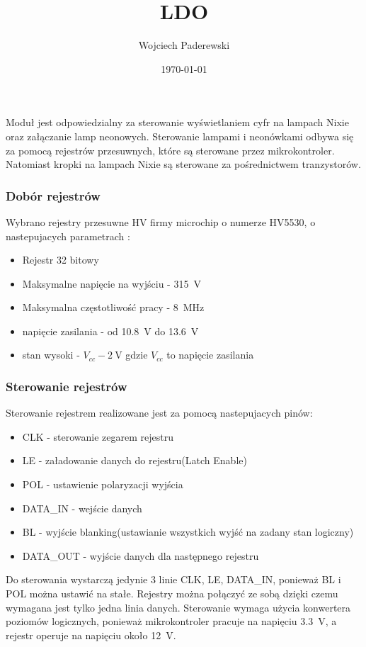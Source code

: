 \documentclass[../../main.tex]{subfiles}
\author{Wojciech Paderewski}
\date{\today}
\title{LDO}
\begin{document}
Moduł jest odpowiedzialny za sterowanie wyświetlaniem cyfr na lampach Nixie oraz załączanie lamp neonowych.
Sterowanie lampami i neonówkami odbywa się za pomocą rejestrów przesuwnych, które są sterowane przez mikrokontroler.
Natomiast kropki na lampach Nixie są sterowane za pośrednictwem tranzystorów.

\subsubsection{Dobór rejestrów}
Wybrano rejestry przesuwne HV firmy microchip o numerze HV5530, o nastepujacych parametrach \cite{st:rejestry}:
\begin{itemize}
    \item Rejestr 32 bitowy
    \item Maksymalne napięcie na wyjściu - \SI{315}{\volt}
    \item Maksymalna częstotliwość pracy - \SI{8}{\mega\hertz}
    \item napięcie zasilania - od \SI{10.8}{\volt} do \SI{13.6}{\volt}
    \item stan wysoki - $V_{cc} - \SI{2}{\volt}$ gdzie $V_{cc}$ to napięcie zasilania
\end{itemize}

\subsubsection{Sterowanie rejestrów}
Sterowanie rejestrem realizowane jest za pomocą nastepujacych pinów:
\begin{itemize}
    \item CLK - sterowanie zegarem rejestru
    \item LE - załadowanie danych do rejestru(Latch Enable)
    \item POL - ustawienie polaryzacji wyjścia
    \item DATA\_IN - wejście danych
    \item BL - wyjście blanking(ustawianie wszystkich wyjść na zadany stan logiczny)
    \item DATA\_OUT - wyjście danych dla następnego rejestru
\end{itemize}

Do sterowania wystarczą jedynie 3 linie CLK, LE, DATA\_IN, ponieważ BL i POL można ustawić na stałe.
Rejestry można połączyć ze sobą dzięki czemu wymagana jest tylko jedna linia danych.
Sterowanie wymaga użycia konwertera poziomów logicznych, ponieważ mikrokontroler pracuje na napięciu \SI{3.3}{\volt}, a rejestr operuje 
na napięciu około \SI{12}{\volt}.
\end{document}
